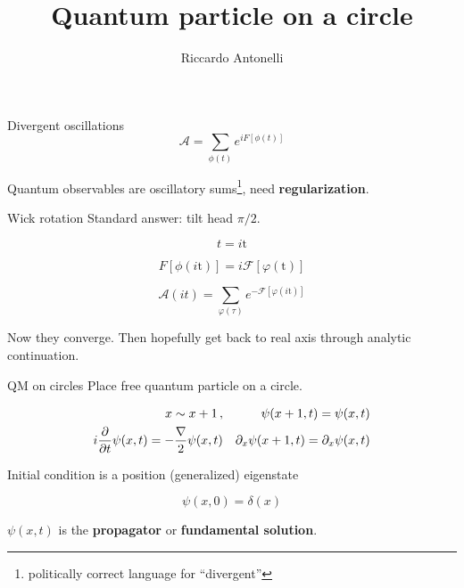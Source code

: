\documentclass{beamer}
\title{Quantum particle on a circle}
\author{Riccardo Antonelli}
\begin{document}
\begin{frame}
    \maketitle
\end{frame}

\begin{frame}{Divergent oscillations}
\begin{equation*}
    \mathcal{A} = \sum_{\phi(t)} e^{iF[\phi(t)]}
    \label{}
\end{equation*}

Quantum observables are oscillatory sums\footnote{politically correct language for ``divergent''}, need \textbf{regularization}.

\end{frame}

\begin{frame}{Wick rotation}
    Standard answer: tilt head $\pi/2$.

    \begin{equation}
        t = i\mathrm{t}
        \label{}
    \end{equation}

    \begin{equation}
        F[\phi(i\mathrm{t})] = i \mathcal{F}[\varphi(\mathrm{t})]
        \label{}
    \end{equation}

    \begin{equation}
        \mathcal{A}(it) = \sum_{\varphi(\tau)} e^{-\mathcal{F}[\varphi(i\mathrm{t})]}
        \label{}
    \end{equation}

    Now they converge. Then hopefully get back to real axis through analytic continuation.
\end{frame}

\begin{frame}{QM on circles}
    Place free quantum particle on a circle.

    \begin{align}
        x \sim x + 1\,, && \psi(x+1,t) = \psi(x,t)\\
        i \pdv{t} \psi(x,t) = - {\nabla \over 2} \psi(x,t) && \partial_x \psi(x+1,t) = \partial_x \psi(x,t)
        \label{}
    \end{align}
    
    Initial condition is a position (generalized) eigenstate

    \begin{equation}
        \psi(x,0) = \delta(x)
        \label{}
    \end{equation}

    $\psi(x,t)$ is the \textbf{propagator} or \textbf{fundamental solution}.

\end{frame}
\end{document}
